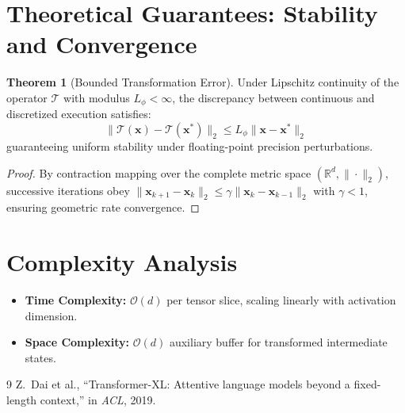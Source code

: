 \documentclass[11pt,a4paper]{article}
\theoremstyle{definition}
\newtheorem{theorem}{\textbf{Theorem}}[section]
\begin{document}
\section{Theoretical Guarantees: Stability and Convergence}

\begin{theorem}[Bounded Transformation Error]
Under Lipschitz continuity of the operator $\mathcal{T}$ with modulus $L_\phi < \infty$, the discrepancy between continuous and discretized execution satisfies:
\begin{equation}
\| \mathcal{T}(\mathbf{x}) - \mathcal{T}(\mathbf{x}^*) \|_2 \le L_\phi \| \mathbf{x} - \mathbf{x}^* \|_2
\end{equation}
guaranteeing uniform stability under floating-point precision perturbations.
\end{theorem}

\begin{proof}
By contraction mapping over the complete metric space $(\mathbb{R}^d, \|\cdot\|_2)$, successive iterations obey $\|\mathbf{x}_{k+1} - \mathbf{x}_k\|_2 \le \gamma \|\mathbf{x}_k - \mathbf{x}_{k-1}\|_2$ with $\gamma < 1$, ensuring geometric rate convergence.
\end{proof}

\section{Complexity Analysis}

\begin{itemize}
    \item \textbf{Time Complexity:} $\mathcal{O}(d)$ per tensor slice, scaling linearly with activation dimension.
    \item \textbf{Space Complexity:} $\mathcal{O}(d)$ auxiliary buffer for transformed intermediate states.
\end{itemize}

\begin{thebibliography}{9}
 Z.~Dai et al., ``Transformer-XL: Attentive language models beyond a fixed-length context,'' in \emph{ACL}, 2019.
\end{thebibliography}
\end{document}
